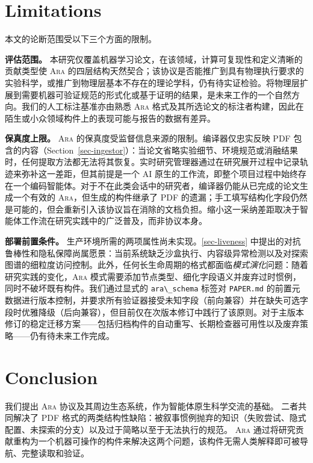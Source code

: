 \documentclass[
]{article}
\newcommand{\passthrough}[1]{#1}
\theoremstyle{definition}
\newcommand{\ara}{\textsc{Ara}}
\begin{document}
\section{Limitations}\label{sec-limitations}

本文的论断范围受以下三个方面的限制。

\textbf{评估范围。}
本研究仅覆盖机器学习论文，在该领域，计算可复现性和定义清晰的贡献类型使
\ara{}
的四层结构天然契合；该协议是否能推广到具有物理执行要求的实验科学，或推广到物理层基本不存在的理论学科，仍有待实证检验。将物理层扩展到需要机器可验证规范的形式化或基于证明的结果，是未来工作的一个自然方向。我们的人工标注基准亦由熟悉
\ara{}
格式及其所选论文的标注者构建，因此在陌生或小众领域构件上的表现可能与报告的数据有差异。

\textbf{保真度上限。} \ara{}
的保真度受监督信息来源的限制。编译器仅忠实反映 PDF
包含的内容（Section~\ref{sec-ingestor}）：当论文省略实验细节、环境规范或消融结果时，任何提取方法都无法将其恢复。实时研究管理器通过在研究展开过程中记录轨迹来弥补这一差距，但其前提是一个
AI
原生的工作流，即整个项目过程中始终存在一个编码智能体。对于不在此类会话中的研究者，编译器仍能从已完成的论文生成一个有效的
\ara{}，但生成的构件继承了 PDF
的遗漏；手工填写结构化字段仍然是可能的，但会重新引入该协议旨在消除的文档负担。缩小这一采纳差距取决于智能体工作流在研究实践中的广泛普及，而非协议本身。

\textbf{部署前置条件。}
生产环境所需的两项属性尚未实现。\ref{sec-liveness}
中提出的对抗鲁棒性和隐私保障尚属愿景：当前系统缺乏沙盒执行、内容级异常检测以及对探索图谱的细粒度访问控制。此外，任何长生命周期的格式都面临\emph{模式演化}问题：随着研究实践的变化，\ara{}
模式需要添加节点类型、细化字段语义并废弃过时惯例，同时不破坏既有构件。我们通过显式的
\passthrough{\lstinline!ara\_schema!} 标签对
\passthrough{\lstinline!PAPER.md!}
的前置元数据进行版本控制，并要求所有验证器接受未知字段（前向兼容）并在缺失可选字段时优雅降级（后向兼容），但目前仅在次版本修订中践行了该原则。对于主版本修订的稳定迁移方案------包括归档构件的自动重写、长期检查器可用性以及废弃策略------仍有待未来工作完成。

\section{Conclusion}\label{sec-conclusion}

我们提出 \ara{} 协议及其周边生态系统，作为智能体原生科学交流的基础。
二者共同解决了 PDF
格式的两类结构性缺陷：被叙事惯例抛弃的知识（失败尝试、隐式配置、未探索的分支）以及过于简略以至于无法执行的规范。
\ara{}
通过将研究贡献重构为一个机器可操作的构件来解决这两个问题，该构件无需人类解释即可被导航、完整读取和验证。
\end{document}
